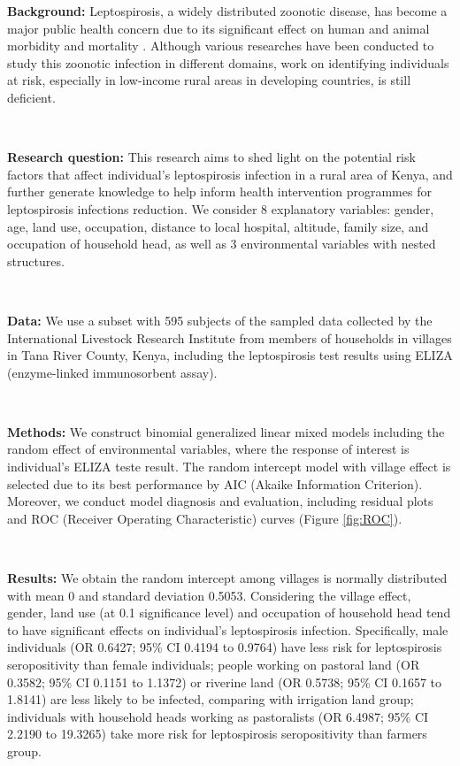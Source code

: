 \documentclass[11pt,twoside]{article}
\numberwithin{Theorem}{section}
\numberwithin{Definition}{section}
\numberwithin{Lemma}{section}
\numberwithin{Algorithm}{section}
\numberwithin{equation}{section}
\begin{document}
\textbf{Background:} Leptospirosis, a widely distributed zoonotic disease, has become a major public health concern due to its significant effect on human and animal morbidity and mortality \cite{haake2015leptospirosis}. Although various researches have been conducted to study this zoonotic infection in different domains, work on identifying individuals at risk, especially in low-income rural areas in developing countries, is still deficient.

\

\textbf{Research question:} This research aims to shed light on the potential risk factors that affect individual's leptospirosis infection in a rural area of Kenya, and further generate knowledge to help inform health intervention programmes for leptospirosis infections reduction. We consider 8 explanatory variables: gender, age, land use, occupation, distance to local hospital, altitude, family size, and occupation of household head, as well as 3 environmental variables with nested structures.

\

\textbf{Data:} We use a subset with 595 subjects of the sampled data collected by the International Livestock Research Institute from members of households in villages in Tana River County, Kenya, including the leptospirosis test results using ELIZA (enzyme-linked immunosorbent assay). 


\

\textbf{Methods:} We construct binomial generalized linear mixed models including the random effect of environmental variables, where the response of interest is individual's ELIZA teste result. The random intercept model with village effect is selected due to its best performance by AIC (Akaike Information Criterion). Moreover, we conduct model diagnosis and evaluation, including residual plots and ROC (Receiver Operating Characteristic) curves (Figure \ref{fig:ROC}). 

\

\textbf{Results:} We obtain the random intercept among villages is normally distributed with mean 0 and standard deviation 0.5053. Considering the village effect, gender, land use (at 0.1 significance level) and occupation of household head tend to have significant effects on individual's leptospirosis infection. Specifically, male individuals (OR 0.6427; 95\% CI 0.4194 to 0.9764) have less risk for leptospirosis seropositivity than female individuals; people working on pastoral land (OR 0.3582; 95\% CI 0.1151 to 1.1372) or riverine land (OR 0.5738; 95\% CI 0.1657 to 1.8141) are less likely to be infected, comparing with irrigation land group; individuals with household heads working as pastoralists (OR 6.4987; 95\% CI 2.2190 to 19.3265) take more risk for leptospirosis seropositivity than farmers group.
\end{document}
